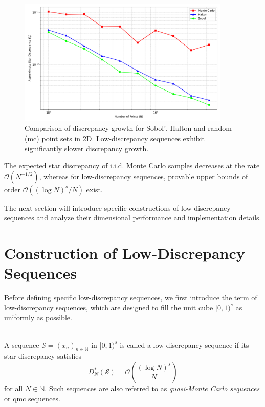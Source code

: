 \begin{figure}[H]
\centering
\includegraphics[width=0.9\textwidth]{Figures/qmc_discrepancy_comparison.png}
\caption{Comparison of discrepancy growth for Sobol', Halton and random
(\ac{mc}) point sets in 2D. Low-discrepancy sequences exhibit significantly
slower discrepancy growth.}
\label{fig:qmc-discrepancy-comparison}
\end{figure}

\begin{remark}
The expected star discrepancy of i.i.d. Monte Carlo samples decreases at the
rate $\mathcal{O}(N^{-1/2})$, whereas for low-discrepancy sequences, provable
upper bounds of order $\mathcal{O}((\log N)^s / N)$ exist.
\cite[Section~2.2]{leobacher2014introduction}
\end{remark}

The next section will introduce specific constructions of low-discrepancy
sequences and analyze their dimensional performance and implementation details.


\section{Construction of Low-Discrepancy Sequences}

Before defining specific low-discrepancy sequences, we first introduce the term of low-discrepancy sequences, which are designed to fill the unit cube $[0,1)^s$
as uniformly as possible.

\begin{definition} \ \\
A sequence $\mathcal{S} = (x_n)_{n\in \mathbb{N}}$ in $[0,1)^s$ is called a low-discrepancy sequence if its star discrepancy satisfies
\begin{equation*}
    D_N^*(\mathcal{S}) = \mathcal{O}\left( \frac{(\log N)^s}{N} \right)
\end{equation*}
for all $N \in \mathbb{N}$. Such sequences are also referred to as
\emph{quasi-Monte Carlo sequences} or \ac{qmc} sequences.
\end{definition}

